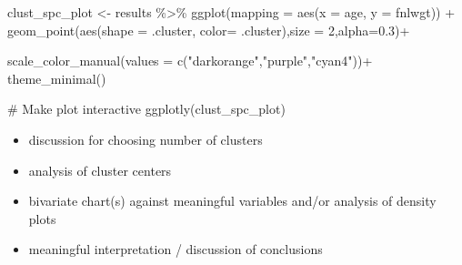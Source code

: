 \documentclass[
  letterpaper,
  DIV=11,
  numbers=noendperiod]{scrartcl}
\newenvironment{Shaded}{\begin{snugshade}}{\end{snugshade}}
\newcommand{\AttributeTok}[1]{\textcolor[rgb]{0.40,0.45,0.13}{#1}}
\newcommand{\CommentTok}[1]{\textcolor[rgb]{0.37,0.37,0.37}{#1}}
\newcommand{\DecValTok}[1]{\textcolor[rgb]{0.68,0.00,0.00}{#1}}
\newcommand{\FloatTok}[1]{\textcolor[rgb]{0.68,0.00,0.00}{#1}}
\newcommand{\FunctionTok}[1]{\textcolor[rgb]{0.28,0.35,0.67}{#1}}
\newcommand{\NormalTok}[1]{\textcolor[rgb]{0.00,0.23,0.31}{#1}}
\newcommand{\OtherTok}[1]{\textcolor[rgb]{0.00,0.23,0.31}{#1}}
\newcommand{\SpecialCharTok}[1]{\textcolor[rgb]{0.37,0.37,0.37}{#1}}
\newcommand{\StringTok}[1]{\textcolor[rgb]{0.13,0.47,0.30}{#1}}
\providecommand{\tightlist}{%
  \setlength{\itemsep}{0pt}\setlength{\parskip}{0pt}}\usepackage{longtable,booktabs,array}
\begin{document}
\begin{Shaded}
\begin{Highlighting}[]
\NormalTok{clust\_spc\_plot }\OtherTok{\textless{}{-}}\NormalTok{ results }\SpecialCharTok{\%\textgreater{}\%} 
    \FunctionTok{ggplot}\NormalTok{(}\AttributeTok{mapping =} \FunctionTok{aes}\NormalTok{(}\AttributeTok{x =}\NormalTok{ age, }\AttributeTok{y =}\NormalTok{ fnlwgt)) }\SpecialCharTok{+}
    \FunctionTok{geom\_point}\NormalTok{(}\FunctionTok{aes}\NormalTok{(}\AttributeTok{shape =}\NormalTok{ .cluster, }\AttributeTok{color=}\NormalTok{ .cluster),}\AttributeTok{size =} \DecValTok{2}\NormalTok{,}\AttributeTok{alpha=}\FloatTok{0.3}\NormalTok{)}\SpecialCharTok{+} 

  \FunctionTok{scale\_color\_manual}\NormalTok{(}\AttributeTok{values =} \FunctionTok{c}\NormalTok{(}\StringTok{"darkorange"}\NormalTok{,}\StringTok{"purple"}\NormalTok{,}\StringTok{"cyan4"}\NormalTok{))}\SpecialCharTok{+} \FunctionTok{theme\_minimal}\NormalTok{()}

\CommentTok{\# Make plot interactive}
\FunctionTok{ggplotly}\NormalTok{(clust\_spc\_plot)}
\end{Highlighting}
\end{Shaded}

\begin{itemize}
\tightlist
\item
  discussion for choosing number of clusters
\item
  analysis of cluster centers
\item
  bivariate chart(s) against meaningful variables and/or analysis of
  density plots
\item
  meaningful interpretation / discussion of conclusions
\end{itemize}
\end{document}
